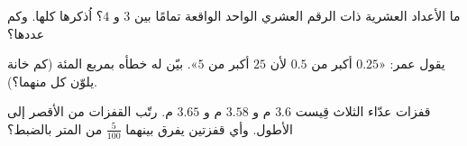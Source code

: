 \begin{exercise}[$\star$]\label{exo:g4:decimals:9}
ما الأعداد العشرية ذات الرقم العشري الواحد الواقعة تمامًا بين
$3$ و $4$؟ اُذكرها كلها. وكم عددها؟
\end{exercise}

\begin{exercise}[$\star\star$]\label{exo:g4:decimals:10}
يقول عمر: «$0.25$ أكبر من $0.5$ لأن $25$ أكبر من
$5$». بيّن له خطأه بمربع المئة (كم خانة يلوّن
كل منهما؟).
\end{exercise}

\begin{exercise}[$\star\star$]\label{exo:g4:decimals:11}
قفزات عدّاء الثلاث قِيست $3.6$ م و $3.58$ م و $3.65$ م.
رتّب القفزات من الأقصر إلى الأطول. وأي قفزتين يفرق بينهما
$\frac{5}{100}$ من المتر بالضبط؟
\end{exercise}
